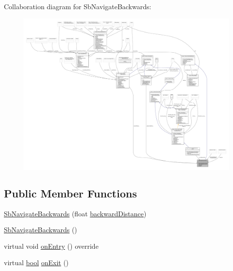 Collaboration diagram for Sb\+Navigate\+Backwards\+:
\nopagebreak
\begin{figure}[H]
\begin{center}
\leavevmode
\includegraphics[width=350pt]{classSbNavigateBackwards__coll__graph}
\end{center}
\end{figure}
\subsection*{Public Member Functions}
\begin{DoxyCompactItemize}
\item 
\hyperlink{classSbNavigateBackwards_ae4e79eeac0dac325a4334445dfe1afc1}{Sb\+Navigate\+Backwards} (float \hyperlink{classSbNavigateBackwards_ad7e0e6b09dae085c1106335e208d6e84}{backward\+Distance})
\item 
\hyperlink{classSbNavigateBackwards_a2d0b3a241987236b79d0152ac208aa87}{Sb\+Navigate\+Backwards} ()
\item 
virtual void \hyperlink{classSbNavigateBackwards_a59b7bc4f0b714f548c73659c87dd405e}{on\+Entry} () override
\item 
virtual \hyperlink{classbool}{bool} \hyperlink{classSbNavigateBackwards_afc23bccc5d951e064bd8a9283934e7ec}{on\+Exit} ()
\end{DoxyCompactItemize}
